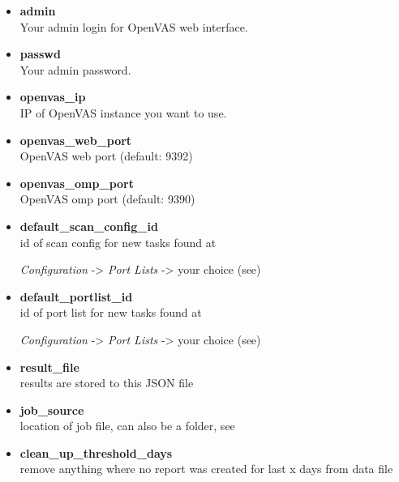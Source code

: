 \begin{itemize}
\item \textbf{admin}\\
Your admin login for OpenVAS web interface.
 
\item \textbf{passwd}\\
Your admin password.

\item \textbf{openvas\_ip}\\
IP of OpenVAS instance you want to use.

\item \textbf{openvas\_web\_port}\\
OpenVAS web port (default: 9392)

\item \textbf{openvas\_omp\_port}\\
OpenVAS omp port (default: 9390)

\item \textbf{default\_scan\_config\_id}\\
id of scan config for new tasks found at

\emph{Configuration} -> \emph{Port Lists} -> your choice (see)

\item \textbf{default\_portlist\_id}\\
id of port list for new tasks found at 

\emph{Configuration} -> \emph{Port Lists} -> your choice (see)

\item \textbf{result\_file}\\
results are stored to this JSON file

\item \textbf{job\_source}\\
location of job file, can also be a folder, see

\item \textbf{clean\_up\_threshold\_days}\\
remove anything where no report was created for last x days from data file



\end{itemize}
 


